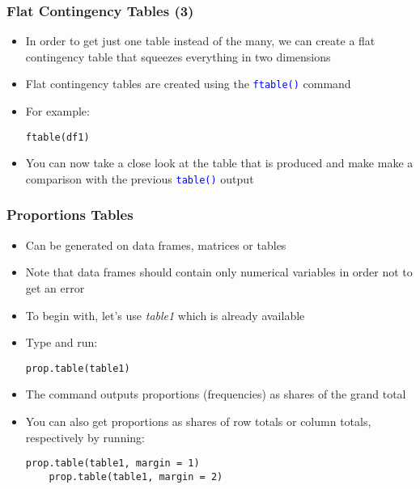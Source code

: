 \documentclass[10pt]{beamer}
\newcommand{\cc}[1]{\texttt{\textcolor{blue}{#1}}}
\theoremstyle{definition}
\begin{document}
\begin{frame}[fragile]
\frametitle{Flat Contingency Tables (3)}
\begin{itemize}
	\item In order to get just one table instead of the many, we can create a flat contingency table that squeezes everything in two dimensions
	
	\item Flat contingency tables are created using the \cc{ftable()} command
	
	\item For example:
	\begin{lstlisting}[style = rstyle, breaklines]
	ftable(df1)
	\end{lstlisting}

	\item You can now take a close look at the table that is produced and make make a comparison with the previous \cc{table()} output
\end{itemize}
\end{frame}

\begin{frame}[fragile]
\frametitle{Proportions Tables}
\begin{itemize}
	\item Can be generated on data frames, matrices or tables
	
	\item Note that data frames should contain only numerical variables in order not to get an error
	
	\item To begin with, let's use \emph{table1} which is already available
	
	\item Type and run:
	\begin{lstlisting}[style = rstyle, breaklines]
	prop.table(table1)
	\end{lstlisting}

	\item The command outputs proportions (frequencies) as shares of the grand total
	
	\item You can also get proportions as shares of row totals or column totals, respectively by running:
	\begin{lstlisting}[style = rstyle, breaklines]
	prop.table(table1, margin = 1)
	prop.table(table1, margin = 2)
	\end{lstlisting}
\end{itemize}
\end{frame}
\end{document}
